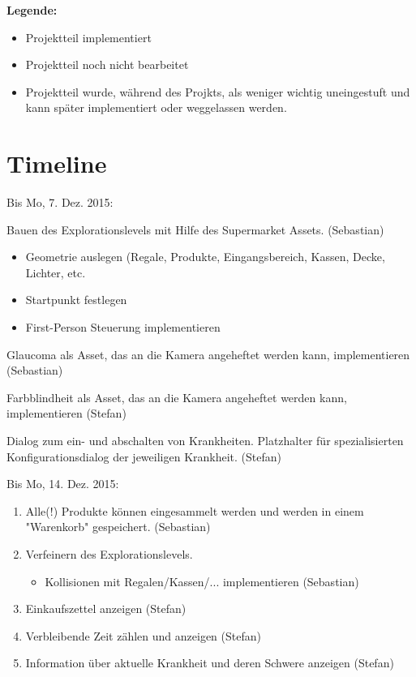 \documentclass[a4paper, 11pt]{scrartcl}
\title{\documenttitle}
\author{\authors}
\date{\dateversion}
\newcommand{\fertig}{\color{ForestGreen}}
\newcommand{\unwichtig}{\color{Gray}}
\newcommand{\entwickler}[1]{\textcolor{BurntOrange}{(#1)}}
\newcommand{\Stefan}{\entwickler{Stefan}}
\newcommand{\Sebastian}{\entwickler{Sebastian}}
\begin{document}
\maketitle

{\bfseries Legende:}
\begin{itemize}
    \item {\fertig Projektteil implementiert}
    \item {Projektteil noch nicht bearbeitet}
    \item {\unwichtig Projektteil wurde, während des Projkts, als weniger
    wichtig uneingestuft und kann später implementiert oder weggelassen werden.}
\end{itemize}


\section{Timeline}
Bis Mo, 7. Dez. 2015:
\begin{enumerate}
    {\fertig
    \item Bauen des Explorationslevels mit Hilfe des Supermarket Assets. \Sebastian
    \begin{itemize}
        \item Geometrie auslegen (Regale, Produkte, Eingangsbereich, Kassen, Decke, Lichter, etc.
        \item Startpunkt festlegen
        \item First-Person Steuerung implementieren
    \end{itemize}
    }
    \item Glaucoma als Asset, das an die Kamera angeheftet werden kann, implementieren \Sebastian
    {\fertig \item Farbblindheit als Asset, das an die Kamera angeheftet werden kann, implementieren \Stefan}
    \item Dialog zum ein- und abschalten von Krankheiten. Platzhalter für spezialisierten Konfigurationsdialog der jeweiligen Krankheit. \Stefan
\end{enumerate}
Bis Mo, 14. Dez. 2015:
\begin{enumerate}
    \item Alle(!) Produkte können eingesammelt werden und werden in einem "Warenkorb" gespeichert. \Sebastian
    \item Verfeinern des Explorationslevels.
    \begin{itemize}
        \item Kollisionen mit Regalen/Kassen/... implementieren \Sebastian
    \end{itemize}
    \item Einkaufszettel anzeigen \Stefan
    \item Verbleibende Zeit zählen und anzeigen \Stefan
    \item Information über aktuelle Krankheit und deren Schwere anzeigen \Stefan
\end{enumerate}
\end{document}
